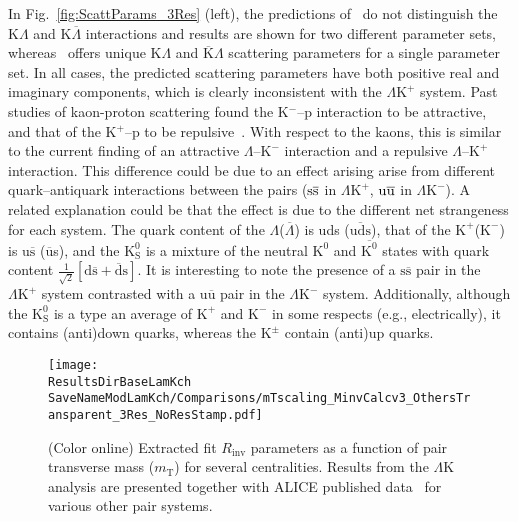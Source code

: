 \documentclass[ALICE,manyauthors]{cernphprep}
\newcommand{\ResultsDirBaseLamKch}{/home/jesse/Analysis/FemtoAnalysis/Results/Results_cLamcKch_20190319/}
\newcommand{\MomRes}{_MomResCrctn}%
\newcommand{\NonFlatBgdLamKch}{_NonFlatBgdCrctnLamK0LamKchPolynomial}
\newcommand{\ResNum}{_3Res}
\newcommand{\PrimMaxDecay}{_PrimMaxDecay10fm}
\newcommand{\ResMethod}{_UsingXiDataAndCoulombOnly}
\newcommand{\ParamFixAndShareLamKch}{_ShareLam_Dualie_ShareLam_ShareRadii}
\newcommand{\SaveNameModLamKch}{\MomRes\NonFlatBgdLamKch\ResNum\PrimMaxDecay\ResMethod\ParamFixAndShareLamKch}
\newcommand{\mt}{$m_{\mathrm{T}}$\xspace}
\newcommand{\Lam}{$\Lambda$\xspace}
\newcommand{\ALam}{$\overline{\Lambda}$\xspace}
\newcommand{\KchP}{$\mathrm{K^{+}}$\xspace}
\newcommand{\KchM}{$\mathrm{K^{-}}$\xspace}
\newcommand{\Kpm}{$\mathrm{K^{\pm}}$\xspace}
\newcommand{\Ks}{$\mathrm{K^{0}_{S}}$\xspace}
\newcommand{\LamK}{$\Lambda$K\xspace}
\newcommand{\LamKchP}{$\Lambda\mathrm{K^{+}}$\xspace}
\newcommand{\LamKchM}{$\Lambda\mathrm{K^{-}}$\xspace}
\begin{document}
In Fig.~\ref{fig:ScattParams_3Res} (left), the predictions of~\cite{Liu:2006xja} do not distinguish the K\Lam and K\ALam interactions and results are shown for two different parameter sets, whereas~\cite{Mai:2009ce} offers unique K\Lam and $\overline{\mathrm{K}}$\Lam scattering parameters for a single parameter set. 
In all cases, the predicted scattering parameters have both positive real and imaginary components, which is {\color{red}clearly} inconsistent with the \LamKchP system.
Past studies of kaon-proton scattering found the K$^{-}${\color{red}--}p interaction to be attractive, and that of the K$^{+}${\color{red}--}p to be repulsive~\cite{Humphrey:1962zz, Hadjimichef:2002xe, Ikeda:2012au}.
With respect to the kaons, this is similar to the current finding of an attractive \Lam{\color{red}--}\KchM interaction and a repulsive \Lam{\color{red}--}\KchP interaction.
This difference could {\color{red}be due to an effect arising} {\color{blue}arise} from different quark--antiquark interactions between the pairs ($\rm s\overline{s}$ in \LamKchP, $\rm u\overline{u}$ in \LamKchM).
A related explanation could be that the effect is due to the different net strangeness for each system.
The quark content of the \Lam (\ALam) is uds ($\overline{\mathrm{uds}}$), that of the \KchP (\KchM) is u$\overline{\mathrm{s}}$ ($\overline{\mathrm{u}}$s), and the \Ks is a mixture of the neutral $\mathrm{K}^{0}$ and $\overline{\mathrm{K}^{0}}$ states with quark content $\frac{1}{\sqrt{2}}\left[\mathrm{d\overline{s} + \overline{d}s}\right]$.
It is interesting to note the presence of a $\mathrm{s\overline{s}}$ pair in the \LamKchP system contrasted with a $\mathrm{u\overline{u}}$ pair in the \LamKchM system.
Additionally, although the \Ks is {\color{red}a type} {\color{blue}an} average of \KchP and \KchM in some respects (e.g., electrically), it contains (anti)down quarks, whereas the \Kpm contain (anti)up quarks.

\begin{figure}[h]
  \centering
  \texttt{[image: \\ResultsDirBaseLamKch\\SaveNameModLamKch/Comparisons/mTscaling\_MinvCalcv3\_OthersTransparent\_3Res\_NoResStamp.pdf]}
  \caption[\mt Scaling of Radii: 3 Residuals in Fit]
  {
  (Color online) Extracted fit $R_{\mathrm{inv}}$ parameters as a function of pair transverse mass (\mt) for several centralities.
  Results from the \LamK analysis are presented together with ALICE published data~\cite{Adam:2015vja} for various other pair systems.  
  }
  \label{fig:mTScalingOfRadii_3Res}
\end{figure}
\end{document}
